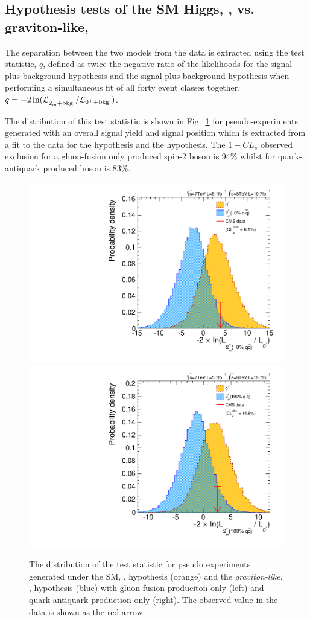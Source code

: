\subsection{Hypothesis tests of the SM Higgs, \zerop, vs. graviton-like, \twomp}
\label{sec:spin_separation}

The separation between the two models from the data is extracted using the test statistic, $q$, defined as twice the negative ratio 
of the likelihoods for the \zerop signal plus background hypothesis and the \twomp signal plus background hypothesis when 
performing a simultaneous fit of all forty event classes together, $q=-2\,{\ln({\cal L}_{2^{+}_\mathrm{m} + \mathrm{bkg.}}/{\cal
L}_{0^+ + \mathrm{bkg.}})}$.

The distribution of this test statistic is shown in 
Fig.~\ref{fig:separation} for pseudo-experiments generated with an overall signal yield and signal position which is extracted from a fit to the data for
the \zerop hypothesis 
and the \twomp hypothesis. The $1-CL_{s}$ observed exclusion for a gluon-fusion only produced spin-2 boson is 94\% whilst for quark-antiquark produced boson is 83\%. 

\begin{figure}
  \begin{center}
    \includegraphics[width=0.49\linewidth]{results/plots/2pm0.pdf}
    \includegraphics[width=0.49\linewidth]{results/plots/2pm1.pdf}
    \caption[Distributions of the test statistic for different spin hypotheses compared to the \SM]{The distribution of the test statistic for pseudo experiments generated under the SM, \zerop, hypothesis (orange) and the \emph{graviton-like}, \twomp, hypothesis (blue) with gluon fusion produciton only (left) and quark-antiquark production only (right). The observed value in the data is shown as the red arrow.}
    \label{fig:separation}
  \end{center}
\end{figure}

